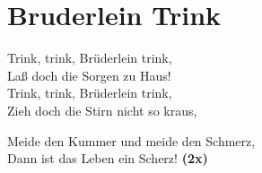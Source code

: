 \section{Bruderlein Trink}
Trink, trink, Brüderlein trink,\\
Laß doch die Sorgen zu Haus!\\
Trink, trink, Brüderlein trink,\\
Zieh doch die Stirn nicht so kraus,

Meide den Kummer und meide den Schmerz,\\
Dann ist das Leben ein Scherz! \textbf{(2x)}